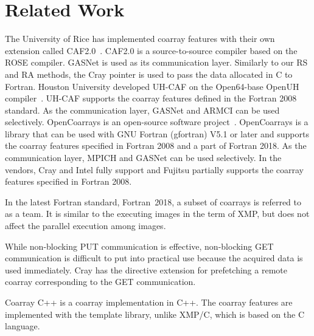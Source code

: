 ﻿\section{Related Work}\label{sec:related}

The University of Rice has implemented coarray features with their own extension 
called CAF2.0~\cite{Rice}.
CAF2.0 is a source-to-source compiler based on the ROSE compiler. GASNet is used as its 
communication layer.
Similarly to our RS and RA methods, the Cray pointer is used to pass the data 
allocated in C to Fortran.
%
Houston University developed UH-CAF on the Open64-base OpenUH compiler~\cite{HU}. 
UH-CAF supports the coarray features defined in the Fortran 2008 standard. As the communication 
layer, GASNet and ARMCI can be used selectively.
%
OpenCoarrays is an open-source software project~\cite{OpenCo}. OpenCoarrays is a library 
that can be used with GNU Fortran (gfortran) V5.1 or later and supports the coarray features
specified in Fortran 2008 and a part of Fortran 2018. As the communication layer,
MPICH and GASNet can be used selectively.
%
In the vendors, Cray and Intel fully support and Fujitsu partially supports the coarray features
specified in Fortran 2008.

In the latest Fortran standard, Fortran~2018, a subset of coarrays is referred to as a team.
It is similar to the executing images in the term of XMP, but does not affect
the parallel execution among images.

While non-blocking PUT communication is effective, non-blocking GET communication
is difficult to put into practical use because the acquired data is used immediately.
Cray has the directive extension for prefetching a remote coarray corresponding to 
the GET communication.

Coarray C++ is a coarray implementation in C++. The coarray features are implemented
with the template library, unlike XMP/C, which is based on the C language.


